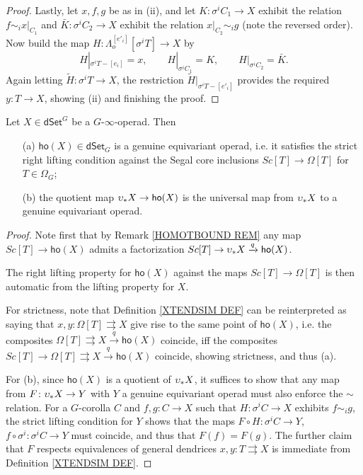 \documentclass[a4paper,10pt
,draft
]{article}%
\renewcommand{\1}{\eta}%
\begin{document}
\begin{proof}
Lastly, let $x,f,g$ be as in (ii), 
and let
$K \colon \sigma^i C_1 \to X$ exhibit the relation
$f \sim_i x|_{C_1}$
and 
$ \bar{K} \colon \sigma^i C_2 \to X$
exhibit the relation
$x|_{C_2} \sim_i g$ (note the reversed order).
Now build the map
$H \colon \Lambda_o^{[e'_i]}[\sigma^i T] \to X$ by
\[
	H|_{\sigma^i T - [e_i]} = x,
\qquad
	H|_{\sigma^i C_1} = K,
\qquad
	H|_{\sigma^i C_2} = \bar{K}.
\]
Again letting 
$\widetilde{H} \colon \sigma^i T \to X$,
the restriction 
$\widetilde{H}|_{\sigma^i T - [e'_i]}$
provides the required $y \colon T \to X$,
showing (ii) and finishing the proof.
\end{proof}


\begin{corollary}\label{HOOPUNIV COR}
Let $X \in \mathsf{dSet}^G$ be a $G$-$\infty$-operad. Then
	\begin{itemize}
	\item[(a)] $\mathsf{ho}(X)\in \mathsf{dSet}_G$ is a genuine equivariant operad, i.e. it satisfies the strict right lifting condition against the Segal core inclusions
	$Sc[T] \to \Omega[T]$ for $T \in \Omega_G$;
	\item[(b)] the quotient map
	$\upsilon_{\**}X \to \mathsf{ho}(X)$ is the universal map from $\upsilon_{\**}X$ to a genuine equivariant operad.
	\end{itemize}
\end{corollary}

\begin{proof}
	Note first that by Remark \ref{HOMOTBOUND REM}
	any map 	$Sc[T] \to \mathsf{ho}(X)$ admits a factorization 
	$Sc[T] \to \upsilon_{\**}X \xrightarrow{q} \mathsf{ho}(X)$.
	
	The right lifting property for $\mathsf{ho}(X)$
	against the maps $Sc[T] \to \Omega[T]$
	is then automatic from the lifting property for $X$.

	For strictness,	
	note that Definition \ref{XTENDSIM DEF}
	can be reinterpreted as saying that
	$x,y \colon \Omega[T] \rightrightarrows X$
	give rise to the same point of 
	$\mathsf{ho}(X)$, i.e. 
	the composites 
	$\Omega[T] \rightrightarrows X \xrightarrow{q}
	\mathsf{ho}(X)$ coincide, 
	iff the composites 
	$Sc[T] \to \Omega[T] \rightrightarrows X \xrightarrow{q}
	\mathsf{ho}(X)$ coincide, showing strictness, and thus (a).
		
	For (b), since $\mathsf{ho}(X)$ is a quotient of
	$\upsilon_{\**} X$, it suffices to show that any map
	from $F \colon \upsilon_{\**}X \to Y$ with $Y$ a genuine equivariant operad must also enforce the $\sim$ relation.
	For a $G$-corolla $C$ and
	$f,g\colon C \to X$ such that 
	$H \colon \sigma^i C \to X$ exhibits
	$f \sim_i g$, 
	the strict lifting condition for $Y$
	shows that the maps
	$F\circ H \colon \sigma^i C \to Y$,
	$f \circ \sigma^i \colon \sigma^i C \to Y$
	must coincide, and thus that
	$F(f)=F(g)$.
	The further claim that $F$ respects equivalences
	of general dendrices $x,y\colon T \rightrightarrows X$
	is immediate from Definition \ref{XTENDSIM DEF}.
\end{proof}
\end{document}
